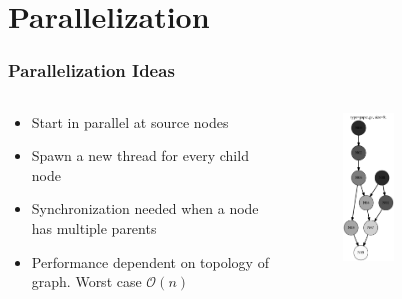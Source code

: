 \section{Parallelization}
\begin{frame}

\frametitle{Parallelization Ideas}
\begin{columns}
  \begin{column}{0.5\textwidth}
    \begin{itemize}
        \item Start in parallel at source nodes
        \item Spawn a new thread for every child node
        \item Synchronization needed when a node has multiple parents
        \item Performance dependent on topology of graph. Worst case $\mathcal{O}(n)$
    \end{itemize}
  \end{column}
  
  \begin{column}{0.5\textwidth}
    \begin{figure}[ht]
    \includegraphics[width=0.4\textwidth]{paper.png}
    \end{figure}
  \end{column}
\end{columns}

\end{frame}

